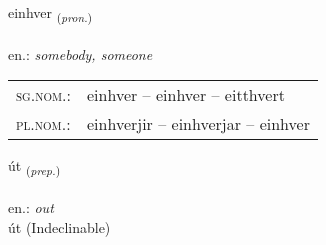 \documentclass[frontgrid, backgrid]{flacards}\usepackage[]{graphicx}\usepackage[]{xcolor}
\begin{document}
\renewcommand{\blhead}{\vskip5pt {\small\bfseries\footnotesize Fornafn | Pronoun }}
\renewcommand{\bcfoot}{\vskip5pt \hspace{2pt}{\small\bfseries\footnotesize 1K}}


{einhver \small{\textsubscript{(\textit{pron.})}} \\[1ex] %
 \\
en.: \emph{somebody, someone} \\  [2ex]
\renewcommand*{\arraystretch}{0.8}
\begin{tabular}{ll}
\textsc{sg.nom.}: & einhver  --  einhver -- eitthvert \\ 
\textsc{pl.nom.}: & einhverjir -- einhverjar -- einhver
\end{tabular}
}


\renewcommand{\flhead}{\vskip5pt \fboxsep=0pt {\small\bfseries\footnotesize Forsetning | Preposition}}
\renewcommand{\fcfoot}{\vskip5pt \fboxsep=0pt \hspace{2pt}{\small\bfseries\footnotesize 1K}}

\renewcommand{\blhead}{\vskip5pt {\small\bfseries\footnotesize Forsetning | Preposition }}
\renewcommand{\bcfoot}{\vskip5pt \hspace{2pt}{\small\bfseries\footnotesize 1K}}


{út \small{\textsubscript{(\textit{prep.})}} \\[1ex]
\textphonetic{[uːt]} \\
en.: \emph{out} \\  [2ex]
út (Indeclinable)}

\renewcommand{\flhead}{\vskip5pt \fboxsep=0pt {\small\bfseries\footnotesize Sagnorð | Verb}}
\renewcommand{\fcfoot}{\vskip5pt \fboxsep=0pt \hspace{2pt}{\small\bfseries\footnotesize 1K}}

\renewcommand{\blhead}{\vskip5pt {\small\bfseries\footnotesize Sagnorð | Verb }}
\renewcommand{\bcfoot}{\vskip5pt \hspace{2pt}{\small\bfseries\footnotesize 1K}}
\end{document}
